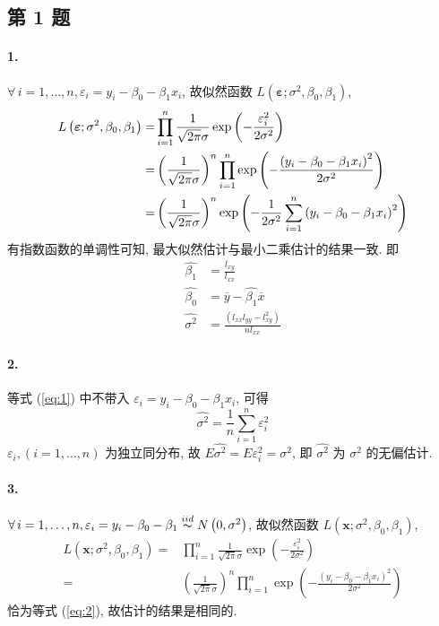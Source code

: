 \documentclass[../main.tex]{subfiles}
\begin{document}
\subsection{第 1 题}
\noindent\paragraph*{1.}
$\forall \, i = 1, \dots, n, \varepsilon_i = y_i - \beta_0 - \beta_1 x_i$, 故似然函数 $L \left( \boldsymbol{\varepsilon}; \sigma^2, \beta_0, \beta_1 \right)$,
\begin{align} \label{eq:1}
    L \left( \boldsymbol{\varepsilon}; \sigma^2, \beta_0, \beta_1 \right)
    =& \prod_{i = 1}^{n} \frac{1}{\sqrt{2 \pi} \sigma} \exp \left( - \frac{\varepsilon_i^2}{2 \sigma^2} \right) \\
    =& \left( \frac{1}{\sqrt{2 \pi} \sigma} \right)^n \prod_{i = 1}^{n} \exp \left( - \frac{\left( y_i - \beta_0 - \beta_1 x_i \right)^2}{2 \sigma^2} \right) \label{eq:2} \\
    =& \left( \frac{1}{\sqrt{2 \pi} \sigma} \right)^n \exp \left( - \frac{1}{2 \sigma^2} \sum_{i = 1}^{n} \left( y_i - \beta_0 - \beta_1 x_i \right)^2 \right) \notag
\end{align}
有指数函数的单调性可知, 最大似然估计与最小二乘估计的结果一致.
即
\begin{align*}
    \widehat{\beta_1} &= \frac{l_{xy}}{l_{xx}} \\
    \widehat{\beta_0} &= \overline{y} - \widehat{\beta_1} \overline{x} \\
    \widehat{\sigma^2} &= \frac{\left( l_{xx} l_{yy} - l_{xy}^2 \right)}{n l_{xx}}
\end{align*}

\noindent\paragraph*{2.}
等式 (\ref{eq:1}) 中不带入 $\varepsilon_i = y_i - \beta_0 - \beta_1 x_i$, 可得
\[
    \widehat{\sigma^2} = \frac{1}{n} \sum_{i = 1}^{n} \varepsilon_i^2
\]
$\varepsilon_i, \left( i = 1, \dots, n \right)$ 为独立同分布,
故 $E \widehat{\sigma^2} = E \varepsilon_i^2 = \sigma^2$,
即 $\widehat{\sigma^2}$ 为 $\sigma^2$ 的无偏估计.

\noindent\paragraph*{3.}
$\forall \, i = 1, \dots, n, \varepsilon_i = y_i - \beta_0 - \beta_1 \overset{iid}{\thicksim} N \left( 0, \sigma^2 \right)$,
故似然函数 $L \left( \boldsymbol{x}; \sigma^2, \beta_0, \beta_1 \right)$,
\begin{align*}
    L \left( \boldsymbol{x}; \sigma^2, \beta_0, \beta_1 \right)
    =& \prod_{i = 1}^{n} \frac{1}{\sqrt{2 \pi} \sigma} \exp \left( - \frac{\varepsilon_i^2}{2 \sigma^2} \right) \\
    =& \left( \frac{1}{\sqrt{2 \pi} \sigma} \right)^n \prod_{i = 1}^{n} \exp \left( - \frac{\left( y_i - \beta_0 - \beta_1 x_i \right)^2}{2 \sigma^2} \right)
\end{align*}
恰为等式 (\ref{eq:2}), 故估计的结果是相同的.
\end{document}
